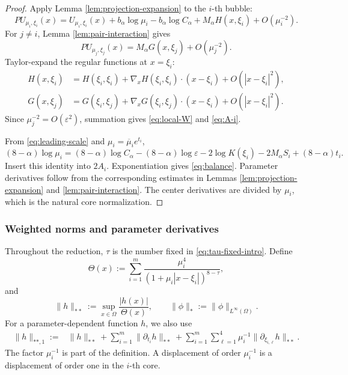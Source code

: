 \documentclass[11pt]{article}
\numberwithin{equation}{section}
\begin{document}
\begin{proof}
Apply Lemma \ref{lem:projection-expansion} to the $i$-th bubble:
\[
PU_{\mu_i,\xi_i}(x)
=U_{\mu_i,\xi_i}(x)+b_\alpha\log\mu_i-b_\alpha\log C_\alpha
+M_\alpha H(x,\xi_i)+O(\mu_i^{-2}).
\]
For $j\neq i$, Lemma \ref{lem:pair-interaction} gives
\[
PU_{\mu_j,\xi_j}(x)=M_\alpha G(x,\xi_j)+O(\mu_j^{-2}).
\]
Taylor-expand the regular functions at $x=\xi_i$:
\begin{align*}
H(x,\xi_i)&=H(\xi_i,\xi_i)
+\nabla_xH(\xi_i,\xi_i)\cdot(x-\xi_i)+O(|x-\xi_i|^2),\\
G(x,\xi_j)&=G(\xi_i,\xi_j)
+\nabla_xG(\xi_i,\xi_j)\cdot(x-\xi_i)+O(|x-\xi_i|^2).
\end{align*}
Since $\mu_j^{-2}=O(\varepsilon^2)$, summation gives
\eqref{eq:local-W} and \eqref{eq:A-i}.

From \eqref{eq:leading-scale} and
$\mu_i=\overline\mu_ie^{t_i}$,
\[
(8-\alpha)\log\mu_i
=(8-\alpha)\log C_\alpha-(8-\alpha)\log\varepsilon
-2\log K(\xi_i)-2M_\alpha S_i+(8-\alpha)t_i.
\]
Insert this identity into $2A_i$. Exponentiation gives
\eqref{eq:balance}. Parameter derivatives follow from the
corresponding estimates in Lemmas \ref{lem:projection-expansion} and
\ref{lem:pair-interaction}. The center derivatives are divided by
$\mu_i$, which is the natural core normalization.
\end{proof}

\subsubsection{Weighted norms and parameter derivatives}

Throughout the reduction, $\tau$ is the number fixed in
\eqref{eq:tau-fixed-intro}. Define
\begin{equation}\label{eq:error-weight}
\Theta(x):=\sum_{i=1}^{m}
\frac{\mu_i^4}{(1+\mu_i|x-\xi_i|)^{8-\tau}},
\end{equation}
and
\begin{equation*}
\|h\|_{**}:=\sup_{x\in\Omega}\frac{|h(x)|}{\Theta(x)},
\qquad
\|\phi\|_*:=\|\phi\|_{L^\infty(\Omega)}.
\end{equation*}
For a parameter-dependent function $h$, we also use
\begin{equation*}
\begin{aligned}
\|h\|_{**,1}:={}&\|h\|_{**}
+\sum_{i=1}^{m}\|\partial_{t_i}h\|_{**}
+\sum_{i=1}^{m}\sum_{\ell=1}^{4}
\mu_i^{-1}\|\partial_{\xi_{i,\ell}}h\|_{**}.
\end{aligned}
\end{equation*}
The factor $\mu_i^{-1}$ is part of the definition. A displacement of order $\mu_i^{-1}$ is a displacement of order one in the $i$-th core.
\end{document}
